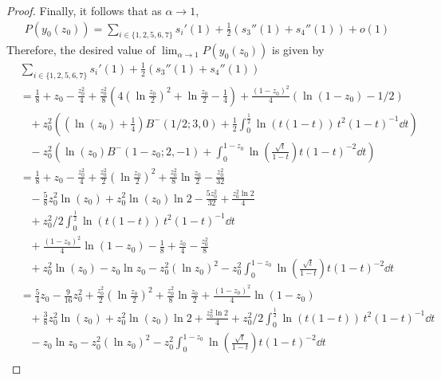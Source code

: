 \begin{proof}
Finally, it follows that as $\alpha \to 1$,
\begin{align*}
P(y_0(z_0)) = \sum_{i \in\{1,2,5,6,7\}} s_i'(1)+\frac{1}{2}(s_3''(1)+s_4''(1)) + o(1)
\end{align*}
Therefore, the desired value of $\lim_{\alpha \rightarrow 1} P(y_0(z_0))$ is given by
\begin{align*}
&\sum_{i \in\{1,2,5,6,7\}} s_i'(1)+\frac{1}{2}(s_3''(1)+s_4''(1))\\
	&=\frac{1}{8}+z_0-\frac{z_0^2}{4}+\frac{z_0^2}{8}(4(\ln\frac{z_0}{2})^2+\ln\frac{z_0}{2} - \frac{1}{4}) 
		+\frac{(1-z_0)^2}{4} (\ln(1-z_0)-1/2 )\\
	&\hspace{10pt}+z_0^2\left(\left(\ln(z_0)+\frac{1}{4}\right) B^-(1/2;3,0)+ \frac{1}{2}\int_0^{\frac{1}{2}} 
		\ln(t(1-t)) \, t^2(1-t)^{-1} \dd t \right) \\
	&\hspace{10pt}- z_0^{2}\left(\ln(z_0)B^-(1-z_0;2,-1)+\int_0^{1-z_0}\ln\left(\frac{\sqrt{t}}{1-t}\right)t(1-t)^{-2} 
		\dd t \right) \\
	&=\frac{1}{8}+z_0-\frac{z_0^2}{4}+\frac{z_0^2}{2}(\ln\frac{z_0}{2})^2
		+\frac{z_0^2}{8}\ln\frac{z_0}{2} - \frac{z_0^2}{32} \\
	&\hspace{10pt}-\frac{5}{8}z_0^2\ln(z_0)+z_0^2\ln(z_0)\ln 2-\frac{5z_0^2}{32} +\frac{z_0^2 \ln2}{4}\\
	&\hspace{10pt}+z_0^2/2\int_0^{\frac{1}{2}} \ln(t(1-t)) \, t^2(1-t)^{-1}\dd t \\
	&\hspace{10pt}+\frac{(1-z_0)^2}{4}\ln(1-z_0) -\frac{1}{8}+\frac{z_0}{4}-\frac{z_0^2}{8}\\
	&\hspace{10pt}+ z_0^2\ln(z_0)-z_0 \ln z_0-z_0^2(\ln z_0)^2
		-z_0^2\int_0^{1-z_0} \ln\left(\frac{\sqrt{t}}{1-t}\right)t(1-t)^{-2}  \dd t \\
	&=\frac{5}{4}z_0-\frac{9}{16}z_0^2 +\frac{z_0^2}{2}(\ln\frac{z_0}{2})^2+\frac{z_0^2}{8}\ln\frac{z_0}{2} 
		+\frac{(1-z_0)^2}{4}\ln(1-z_0) \\
	&\hspace{10pt}+\frac{3}{8}z_0^2\ln(z_0)+z_0^2\ln(z_0)\ln 2+\frac{z_0^2 \ln2}{4}
		+z_0^2/2\int_0^{\frac{1}{2}} \ln(t(1-t)) \, t^2(1-t)^{-1} \dd t \\
	&\hspace{10pt}-z_0 \ln z_0-z_0^2(\ln z_0)^2-z_0^2\int_0^{1-z_0} \ln\left(\frac{\sqrt{t}}{1-t}\right)t(1-t)^{-2} \dd t \\

\end{align*}
\end{proof}
